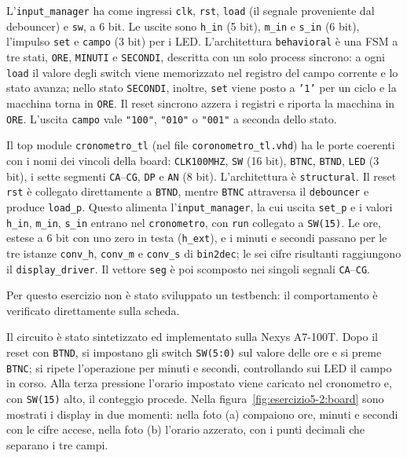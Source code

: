L'\texttt{input\_manager} ha come ingressi \texttt{clk}, \texttt{rst}, \texttt{load} (il segnale proveniente dal debouncer) e \texttt{sw}, a 6 bit. Le uscite sono \texttt{h\_in} (5 bit), \texttt{m\_in} e \texttt{s\_in} (6 bit), l'impulso \texttt{set} e \texttt{campo} (3 bit) per i LED. L'architettura \texttt{behavioral} è una FSM a tre stati, \texttt{ORE}, \texttt{MINUTI} e \texttt{SECONDI}, descritta con un solo process sincrono: a ogni \texttt{load} il valore degli switch viene memorizzato nel registro del campo corrente e lo stato avanza; nello stato \texttt{SECONDI}, inoltre, \texttt{set} viene posto a \texttt{'1'} per un ciclo e la macchina torna in \texttt{ORE}. Il reset sincrono azzera i registri e riporta la macchina in \texttt{ORE}. L'uscita \texttt{campo} vale \texttt{"100"}, \texttt{"010"} o \texttt{"001"} a seconda dello stato.


Il top module \texttt{cronometro\_tl} (nel file \texttt{coronometro\_tl.vhd}) ha le porte coerenti con i nomi dei vincoli della board: \texttt{CLK100MHZ}, \texttt{SW} (16 bit), \texttt{BTNC}, \texttt{BTND}, \texttt{LED} (3 bit), i sette segmenti \texttt{CA}--\texttt{CG}, \texttt{DP} e \texttt{AN} (8 bit). L'architettura è \texttt{structural}. Il reset \texttt{rst} è collegato direttamente a \texttt{BTND}, mentre \texttt{BTNC} attraversa il \texttt{debouncer} e produce \texttt{load\_p}. Questo alimenta l'\texttt{input\_manager}, la cui uscita \texttt{set\_p} e i valori \texttt{h\_in}, \texttt{m\_in}, \texttt{s\_in} entrano nel \texttt{cronometro}, con \texttt{run} collegato a \texttt{SW(15)}. Le ore, estese a 6 bit con uno zero in testa (\texttt{h\_ext}), e i minuti e secondi passano per le tre istanze \texttt{conv\_h}, \texttt{conv\_m} e \texttt{conv\_s} di \texttt{bin2dec}; le sei cifre risultanti raggiungono il \texttt{display\_driver}. Il vettore \texttt{seg} è poi scomposto nei singoli segnali \texttt{CA}--\texttt{CG}.


Per questo esercizio non è stato sviluppato un testbench: il comportamento è verificato direttamente sulla scheda.

\sintesiboard

Il circuito è stato sintetizzato ed implementato sulla Nexys A7-100T. Dopo il reset con \texttt{BTND}, si impostano gli switch \texttt{SW(5:0)} sul valore delle ore e si preme \texttt{BTNC}; si ripete l'operazione per minuti e secondi, controllando sui LED il campo in corso. Alla terza pressione l'orario impostato viene caricato nel cronometro e, con \texttt{SW(15)} alto, il conteggio procede. Nella figura~\ref{fig:esercizio5-2:board} sono mostrati i display in due momenti: nella foto (a) compaiono ore, minuti e secondi con le cifre accese, nella foto (b) l'orario azzerato, con i punti decimali che separano i tre campi.

